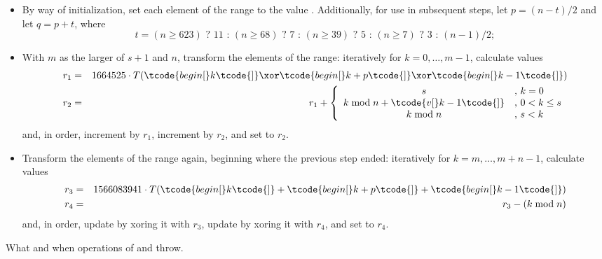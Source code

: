 \begin{itemdescr}
\begin{itemize}
 \item
   By way of initialization,
   set each element of the range to the value .
   Additionally,
   for use in subsequent steps,
   let $p = (n - t) / 2$
   and let $q = p + t$,
   where
   \[%
     t = (n \ge 623) \mbox{ ? } 11 \mbox{ : } (n \ge 68) \mbox{ ? } 7 \mbox{ : } (n \ge 39) \mbox{ ? } 5 \mbox{ : } (n \ge 7) \mbox{ ? } 3 \mbox{ : } (n - 1)/2;
   \]%
 \item
   With $m$ as the larger of $s + 1$ and $n$,
   transform the elements of the range:
   iteratively for $k = 0, \dotsc, m - 1$,
   calculate values
   \begin{eqnarray*}
     r_1 & = &
       1664525 \cdot T(    \tcode{begin[}k\tcode{]}
                      \xor \tcode{begin[}k+p\tcode{]}
                      \xor \tcode{begin[}k-1 \tcode{]}
                      )
     \\
     r_2 & = & r_1 + \left\{
       \begin{array}{cl}
         s                                  & \mbox{,  } k = 0
         \\
         k \bmod n + \tcode{v[}k-1\tcode{]} & \mbox{,  } 0 < k \le s
         \\
         k \bmod n                          & \mbox{,  } s < k
       \end{array}
     \right.
   \end{eqnarray*}
   and, in order,
   increment  by $r_1$,
   increment  by $r_2$,
   and
   set  to $r_2$.
 \item
   Transform the elements of the range again,
   beginning where the previous step ended:
   iteratively for $k = m, \dotsc, m + n - 1$,
   calculate values
   \begin{eqnarray*}
     r_3 & = &
       1566083941 \cdot T( \tcode{begin[}k  \tcode{]}
                         + \tcode{begin[}k+p\tcode{]}
                         + \tcode{begin[}k-1\tcode{]}
                         )
     \\
     r_4 & = & r_3 - (k \bmod n)
   \end{eqnarray*}
   and, in order,
   \noindent
   update  by xoring it with $r_3$,
   update  by xoring it with $r_4$,
   and
   set  to $r_4$.
\end{itemize}

\pnum\throws
What and when  operations of 
and  throw.
\end{itemdescr}

